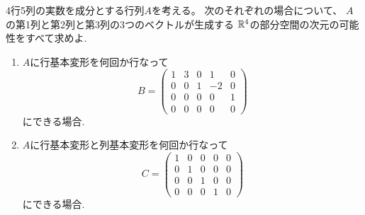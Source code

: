 \documentclass[report]{jlreq}
\begin{document}
\begin{problem}[東大数理 2006A]
    4行5列の実数を成分とする行列$A$を考える。
    次のそれぞれの場合について、
    $A$の第1列と第2列と第3列の3つのベクトルが生成する
    $\mathbb{R}^4$の部分空間の次元の可能性をすべて求めよ.
    \begin{enumerate}
        \item $A$に行基本変形を何回か行なって
            \begin{equation}
                B = \begin{pmatrix}
                    1 & 3 & 0 & 1 & 0 \\
                    0 & 0 & 1 & -2 & 0 \\
                    0 & 0 & 0 & 0 & 1 \\
                    0 & 0 & 0 & 0 & 0
                \end{pmatrix}
            \end{equation}
            にできる場合.
        \item $A$に行基本変形と列基本変形を何回か行なって
            \begin{equation}
                C = \begin{pmatrix}
                    1 & 0 & 0 & 0 & 0 \\
                    0 & 1 & 0 & 0 & 0 \\
                    0 & 0 & 1 & 0 & 0 \\
                    0 & 0 & 0 & 1 & 0
                \end{pmatrix}
            \end{equation}
            にできる場合.
    \end{enumerate}
\end{problem}
\end{document}
